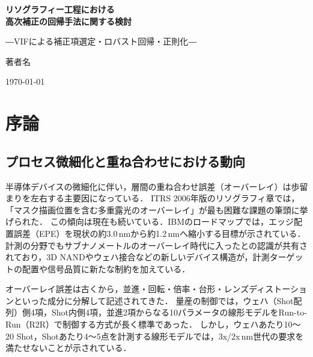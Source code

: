 \documentclass[11pt,a4paper]{ltjsarticle}
\begin{document}
\begin{titlepage}
  \centering
  \vspace*{45mm}
  {\LARGE\bfseries リソグラフィー工程における\\[3mm]高次補正の回帰手法に関する検討\par}
  \vspace{8mm}
  {\large ―VIFによる補正項選定・ロバスト回帰・正則化―\par}
  \vspace{45mm}
  {\Large 著者名\par}  %
  \vspace{8mm}
  {\large \today\par}
  \vfill
\end{titlepage}

\tableofcontents
\newpage

\section{序論}

\subsection{プロセス微細化と重ね合わせにおける動向}

半導体デバイスの微細化に伴い，層間の重ね合わせ誤差（オーバーレイ）は歩留まりを左右する主要因になっている．
ITRS 2006年版のリソグラフィ章では，「マスク描画位置を含む多重露光のオーバーレイ」が最も困難な課題の筆頭に挙げられた\cite{Adel2007}．
この傾向は現在も続いている．IBMのロードマップでは，エッジ配置誤差（EPE）を現状の約3.0\,nmから約1.2\,nmへ縮小する目標が示されている\cite{Gabor2026}．
計測の分野でもサブナノメートルのオーバーレイ時代に入ったとの認識が共有されており\cite{Klein2026}，3D NANDやウェハ接合などの新しいデバイス構造が，計測ターゲットの配置や信号品質に新たな制約を加えている\cite{Katz2026}．

オーバーレイ誤差は古くから，並進・回転・倍率・台形・レンズディストーションといった成分に分解して記述されてきた\cite{MacMillen1982}．
量産の制御では，ウェハ（Shot配列）側4項，Shot内側4項，並進2項からなる10パラメータの線形モデルをRun-to-Run（R2R）で制御する方式が長く標準であった\cite{Duclaux2020}．
しかし，ウェハあたり10〜20 Shot，Shotあたり4〜5点を計測する線形モデルでは，3x/2x\,nm世代の要求を満たせないことが示されている\cite{Huang2012FxFc}．
\end{document}
